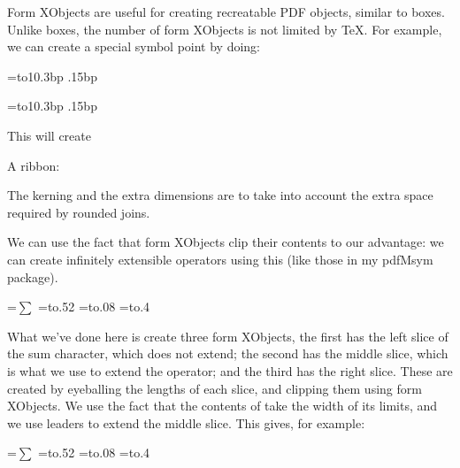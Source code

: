 Form XObjects are useful for creating recreatable PDF objects, similar to boxes.
Unlike boxes, the number of form XObjects is not limited by \TeX.
For example, we can create a special symbol point by doing:

\blisting
\bgroup
{}=\hbox to10.3bp{\vrule width0bp height10.15bp depth.15bp%
\kern.15bp%
\hfil}
\xdef\ribbon{\pdfrefxform\the\pdflastxform\relax}
\egroup
\elisting

\bgroup
{}=\hbox to10.3bp{\vrule width0bp height10.15bp depth.15bp%
\kern.15bp%
\hfil}
\xdef\ribbon{\pdfrefxform\the\pdflastxform\relax}
\egroup

\noindent This will create

\centerline{A ribbon: \ribbon}

The kerning and the extra dimensions are to take into account the extra space required by rounded joins.

We can use the fact that form XObjects clip their contents to our advantage: we can create infinitely
extensible operators using this (like those in my pdfMsym package).

\blisting
\bgroup
{}=\hbox{$\displaystyle\sum$}
=\hbox to.52
=\hbox to.08
=\hbox to.4
  \xdef\suumL{\the\pdflastxform}
  \xdef\suumC{\the\pdflastxform}
  \xdef\suumR{\the\pdflastxform}
\egroup

\def\suum{%
    \mathop{%
        \pdfrefxform\suumL%
        \xleaders\hbox{\pdfrefxform\suumC}\hfill%
        \pdfrefxform\suumR%
    }\limits%
}
\elisting

\noindent What we've done here is create three form XObjects, the first has the left slice of the sum
character, which does not extend; the second has the middle slice, which is what we use to extend the operator;
and the third has the right slice.
These are created by eyeballing the lengths of each slice, and clipping them using form XObjects.
We use the fact that the contents of \macro\mathop{} take the width of its limits, and we use leaders to
extend the middle slice.
This gives, for example:

\bgroup
{}=\hbox{$\displaystyle\sum$}
=\hbox to.52
=\hbox to.08
=\hbox to.4
  \xdef\suumL{\the\pdflastxform}
  \xdef\suumC{\the\pdflastxform}
  \xdef\suumR{\the\pdflastxform}
\egroup

